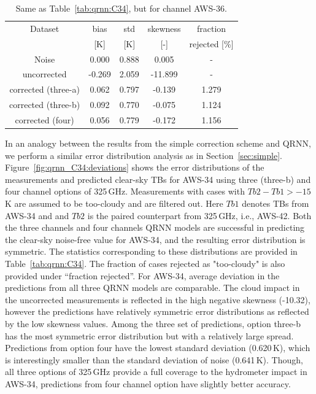 \documentclass[12pt]{article}
\begin{document}
\begin{table}[!p]
	\centering
	\begin{tabular}[b]{c|c|c|c|c}
		Dataset  		  &   bias &   std &   skewness & fraction  \\
		&   [K]  &   [K] & [-] & rejected [\%]\\
		\hline
		Noise                       &  0.000 & 0.888  &              0.005 &      - \\
		uncorrected                 & -0.269 & 2.059 &            -11.899 &      - \\
		corrected (three-a) 		&  0.062 & 0.797 &             -0.139 &      1.279 \\
		corrected (three-b) 		&  0.092 & 0.770 &             -0.075 &      1.124 \\
		corrected (four)   			&  0.056 & 0.779 &             -0.172 &      1.156 \\
		
		
		\hline
	\end{tabular}
	\caption{ Same as Table~\ref{tab:qrnn:C34}, but for channel AWS-36.}
	\label{tab:qrnn:C36}
\end{table}


In an analogy between the results from the simple correction scheme and QRNN, we perform a similar error distribution analysis as in Section~\ref{sec:simple}. Figure~\ref{fig:qrnn_C34:deviations} shows the error distributions of the measurements and predicted clear-sky TBs for AWS-34 using three (three-b) and four channel options of 325\,GHz. Measurements with cases with $Tb2 - Tb1 > -15$\,K are assumed to be too-cloudy and are filtered out. Here $Tb1$ denotes TBs from AWS-34 and and $Tb2$ is the paired counterpart from 325\,GHz, i.e., AWS-42.  Both the three channels and four channels QRNN models are successful in predicting the clear-sky noise-free value for AWS-34, and the resulting error distribution is symmetric. The statistics corresponding to these distributions are provided in Table~\ref{tab:qrnn:C34}. The fraction of cases rejected as "too-cloudy" is also provided under ``fraction rejected''. For AWS-34, average deviation in the predictions from all three QRNN models are comparable.  The cloud impact in the uncorrected measurements is reflected in the high negative skewness (-10.32), however the predictions have relatively symmetric error distributions as reflected by the low skewness values. Among the three set of predictions, option three-b has the most symmetric error distribution but with a relatively large spread. Predictions from option four have the lowest standard deviation (0.620\,K), which is interestingly smaller than the standard deviation of noise (0.641\,K). Though, all three options of 325\,GHz provide a full coverage to the hydrometer impact in AWS-34, predictions from four channel option have slightly better accuracy.
\end{document}
